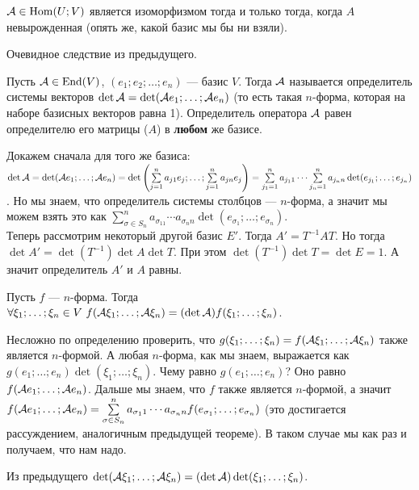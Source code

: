 \documentclass{article}
\begin{document}
\begin{itemize}
\begin{Proof}
        \end{Proof}
        \thm ${\mathcal{A}}\in\operatorname{Hom}(U;V)$ является изоморфизмом тогда и только тогда, когда $A$ невырожденная (опять же, какой базис мы бы ни взяли).
        \begin{Proof}
            Очевидное следствие из предыдущего.
        \end{Proof}
        \dfn Пусть ${\mathcal{A}}\in\operatorname{End}(V)$, $(e_1;e_2;\ldots;e_n)$ --- базис $V$. Тогда  ${\mathcal{A}}$ называется определитель системы векторов $\det{\mathcal{A}}=\det({\mathcal{A}} e_1;\ldots;{\mathcal{A}} e_n)$ (то есть такая $n$-форма, которая на наборе базисных векторов равна 1).
        \thm Определитель оператора ${\mathcal{A}}$ равен определителю его матрицы ($A$) в \textbf{любом} же базисе.
        \begin{Proof}
            Докажем сначала для того же базиса: $\det{\mathcal{A}}=\det({\mathcal{A}} e_1;\ldots;{\mathcal{A}} e_n)=\det\left(\sum\limits_{j=1}^na_{j1}e_j;\ldots;\sum\limits_{j=1}^na_{jn}e_j\right)=\sum\limits_{j_1=1}^na_{j_11}\cdots\sum\limits_{j_n=1}^na_{j_nn}\det(e_{j_1};\ldots;e_{j_n})$. Но мы знаем, что определитель системы столбцов --- $n$-форма, а значит мы можем взять это как $\sum\limits_{\sigma\in S_n}^na_{\sigma_11}\cdots a_{\sigma_nn}\det(e_{\sigma_1};\ldots;e_{\sigma_n})$.\\
            Теперь рассмотрим некоторый другой базис $E'$. Тогда $A'=T^{-1}AT$. Но тогда $\det A'=\det(T^{-1})\det A\det T$. При этом $\det(T^{-1})\det T=\det E=1$. А значит определитель $A'$ и $A$ равны.
        \end{Proof}
        \thm Пусть $f$ --- $n$-форма. Тогда $\forall\xi_1;\ldots;\xi_n\in V~f({\mathcal{A}}\xi_1;\ldots;{\mathcal{A}}\xi_n)=(\det{\mathcal{A}})f(\xi_1;\ldots;\xi_n)$.
        \begin{Proof}
            Несложно по определению проверить, что $g(\xi_1;\ldots;\xi_n)=f({\mathcal{A}}\xi_1;\ldots;{\mathcal{A}}\xi_n)$ также является $n$-формой. А любая $n$-форма, как мы знаем, выражается как $g(e_1;\ldots;e_n)\det(\xi_1;\ldots;\xi_n)$. Чему равно $g(e_1;\ldots;e_n)$? Оно равно $f({\mathcal{A}} e_1;\ldots;{\mathcal{A}} e_n)$. Дальше мы знаем, что $f$ также является $n$-формой, а значит $f({\mathcal{A}} e_1;\ldots;{\mathcal{A}} e_n)=\sum\limits_{\sigma\in S_n}^na_{\sigma_11}\cdots a_{\sigma_nn}f(e_{\sigma_1};\ldots;e_{\sigma_n})$ (это достигается рассуждением, аналогичным предыдущей теореме). В таком случае мы как раз и получаем, что нам надо.
        \end{Proof}
        \thm Из предыдущего $\det({\mathcal{A}}\xi_1;\ldots;{\mathcal{A}}\xi_n)=(\det{\mathcal{A}})\det(\xi_1;\ldots;\xi_n)$.

\end{itemize}
\end{document}
